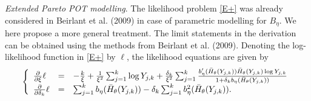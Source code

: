 \documentclass[twoside,leqno,11pt]{article}
\begin{document}
\vspace{0.2cm}\noindent
{\it Extended Pareto POT modelling}. The likelihood problem \eqref{E+} was already considered in Beirlant et al. (2009) in case of  parametric modelling for $B_\eta$. We here propose a more general treatment. The limit statements in the derivation can be obtained using the methods from Beirlant et al. (2009). Denoting the log-likelihood function in \eqref{E+} by $\ell$, the likelihood equations are given by
\begin{equation}
\left\{
\begin{array}{lcl}
{\partial \over \partial \xi} \ell &=&
-{k \over \xi }+ {1 \over \xi^2} \sum_{j=1}^k \log Y_{j,k}
 + {\delta_k \over \xi^2} \sum_{j=1}^k \frac{ b'_\eta (\bar{H}_{\theta}(Y_{j,k}))\bar{H}_{\theta}(Y_{j,k})\log Y_{j,k}}{1+\delta_k b_\eta (\bar{H}_{\theta}(Y_{j,k}))} \\
 {\partial \over \partial \delta_k} \ell &=&
 \sum_{j=1}^k b_\eta (\bar{H}_{\theta}(Y_{j,k}))-\delta_k \sum_{j=1}^k b^2_\eta (\bar{H}_{\theta}(Y_{j,k})).
\end{array}
\right.
\label{systemE+}
\end{equation}
\end{document}
